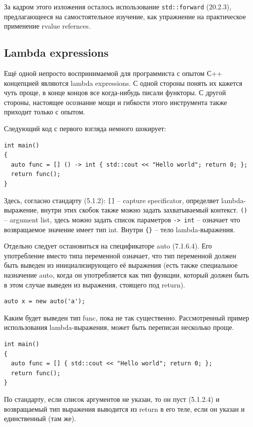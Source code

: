 \documentclass[a4paper,12pt,oneside]{article}
\begin{document}
За кадром этого изложения осталось использование \lstinline!std::forward! (20.2.3), предлагающееся на самостоятельное изучение, как упражнение на практическое применение rvalue refernces.

\subsection{Lambda expressions}

Ещё одной непросто воспринимаемой для программиста с опытом С++ концепцией являются lambda expressions. С одной стороны понять их кажется чуть проще, в конце концов все когда-нибудь писали функторы. С другой стороны, настоящее осознание мощи и гибкости этого инструмента также приходит только с опытом. 

Следующий код с первого взгляда немного шокирует:

\begin{lstlisting}
int main()
{
  auto func = [] () -> int { std::cout << "Hello world"; return 0; };
  return func(); 
}
\end{lstlisting}

Здесь, согласно стандарту (5.1.2): 
\lstinline![]! -- capture specificator, определяет lambda-выражение, внутри этих скобок также можно задать захватываемый контекст.
\lstinline!()! -- argument list, здесь можно задать список параметров
\lstinline!-> int! -- означает что возвращаемое значение имеет тип int.
Внутри \lstinline!{}! -- тело lambda-выражения.

Отдельно следует остановиться на спецификаторе auto (7.1.6.4). Его употребление вместо типа переменной означает, что тип переменной должен быть выведен из инициализирующего её выражения (есть также специальное назначение auto, когда он употребляется как тип функции, который должен быть в этом случае выведен из выражения, стоящего под return).

\begin{lstlisting}
auto x = new auto('a');
\end{lstlisting}

Каким будет выведен тип func, пока не так существенно. Рассмотренный пример использования lambda-выражения, может быть переписан несколько проще.

\begin{lstlisting}
int main()
{
  auto func = [] { std::cout << "Hello world"; return 0; };
  return func(); 
}
\end{lstlisting}

По стандарту, если список аргументов не указан, то он пуст (5.1.2.4) и возвращаемый тип выражения выводится из return в его теле, если он указан и единственный (там же).
\end{document}
